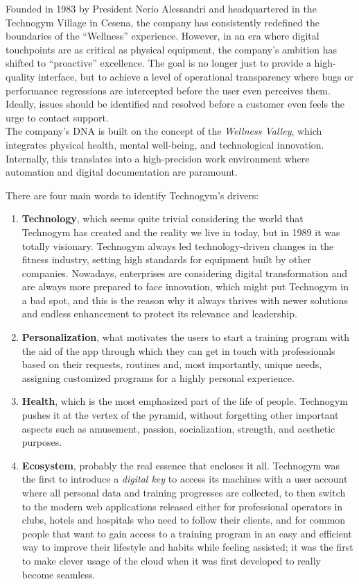 \documentclass[12pt,a4paper,openright,twoside]{book}
\begin{document}
Founded in 1983 by President Nerio Alessandri and headquartered in the Technogym Village in Cesena, the company has consistently redefined the boundaries of the ``Wellness'' experience. However, in an era where digital touchpoints are as critical as physical equipment, the company’s ambition has shifted to ``proactive'' excellence. The goal is no longer just to provide a high-quality interface, but to achieve a level of operational transparency where bugs or performance regressions are intercepted before the user even perceives them. Ideally, issues should be identified and resolved before a customer even feels the urge to contact support. 
\\ The company’s DNA is built on the concept of the \textit{Wellness Valley}, which integrates physical health, mental well-being, and technological innovation. Internally, this translates into a high-precision work environment where automation and digital documentation are paramount.

There are four main words to identify Technogym's drivers: 
\begin{enumerate}[nosep]
    \item \textbf{Technology}, which seems quite trivial considering the world that Technogym has created and the reality we live in today, but in 1989 it was totally visionary. Technogym always led technology-driven changes in the fitness industry, setting high standards for equipment built by other companies. Nowadays, enterprises are considering digital transformation and are always more prepared to face innovation, which might put Technogym in a bad spot, and this is the reason why it always thrives with newer solutions and endless enhancement to protect its relevance and leadership. 
    \item \textbf{Personalization}, what motivates the users to start a training program with the aid of the app through which they can get in touch with professionals based on their requests, routines and, most importantly, unique needs, assigning customized programs for a highly personal experience.
    \item \textbf{Health}, which is the most emphasized part of the life of people. Technogym pushes it at the vertex of the pyramid, without forgetting other important aspects such as amusement, passion, socialization, strength, and aesthetic purposes. 
    \item \textbf{Ecosystem}, probably the real essence that encloses it all. Technogym was the first to introduce a \textit{digital key} to access its machines with a user account where all personal data and training progresses are collected, to then switch to the modern web applications released either for professional operators in clubs, hotels and hospitals who need to follow their clients, and for common people that want to gain access to a training program in an easy and efficient way to improve their lifestyle and habits while feeling assisted; it was the first to make clever usage of the cloud when it was first developed to really become seamless.
\end{enumerate}
\end{document}

